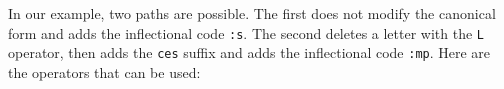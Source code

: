\bigskip
\noindent In our example, two paths are possible. The first does not modify the
canonical form and adds the inflectional code \verb+:s+. The second deletes a letter with
the \verb+L+ operator, then adds the \verb+ces+ suffix and adds the inflectional
code \verb+:mp+. Here are the operators that can be used:


